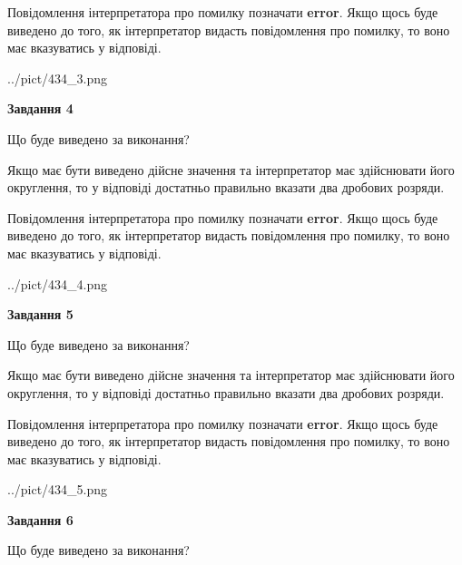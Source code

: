 \documentclass[12pt, ukrainian]{article}
\begin{document}
{\begin {Large}
Повідомлення інтерпретатора про помилку позначати \textbf{error}.
Якщо щось буде виведено до того, як інтерпретатор видасть повідомлення про помилку, 
то воно має вказуватись у відповіді. \par

\begin{center}
	{../pict/434_3.png}
\end{center}
\newpage

{\begin {center}\textbf{Завдання 4}\end {center}}\par
Що буде виведено за виконання? \par

Якщо має бути виведено дійсне значення та інтерпретатор має здійснювати його округлення, 
то у відповіді достатньо правильно вказати два дробових розряди.

Повідомлення інтерпретатора про помилку позначати \textbf{error}.
Якщо щось буде виведено до того, як інтерпретатор видасть повідомлення про помилку, 
то воно має вказуватись у відповіді. \par

\begin{center}
	{../pict/434_4.png}
\end{center}
\newpage

{\begin {center}\textbf{Завдання 5}\end {center}}\par
Що буде виведено за виконання? \par

Якщо має бути виведено дійсне значення та інтерпретатор має здійснювати його округлення, 
то у відповіді достатньо правильно вказати два дробових розряди.

Повідомлення інтерпретатора про помилку позначати \textbf{error}.
Якщо щось буде виведено до того, як інтерпретатор видасть повідомлення про помилку, 
то воно має вказуватись у відповіді. \par

\begin{center}
	{../pict/434_5.png}
\end{center}
\newpage

{\begin {center}\textbf{Завдання 6}\end {center}}\par
Що буде виведено за виконання? \par


\end{Large}}
\end{document}
